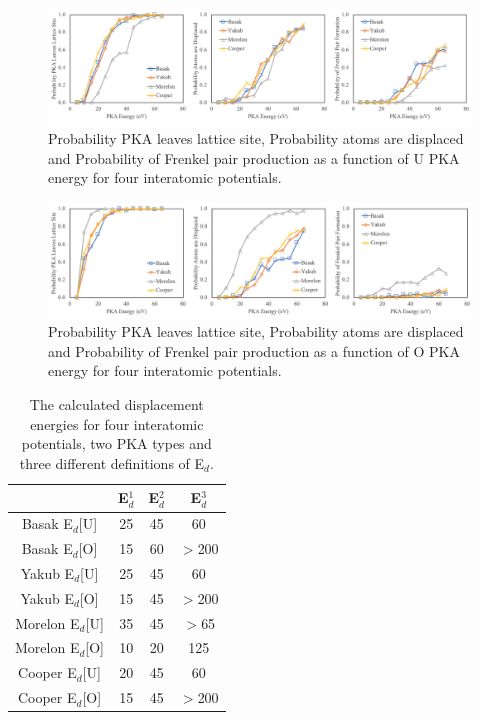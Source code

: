 \documentclass[review]{elsarticle}
\begin{document}
\begin{figure}[h]
 \centering
 \includegraphics[width=1.0\textwidth]{pot_compU.png}
 \caption{Probability PKA leaves lattice site, Probability atoms are displaced and Probability of Frenkel pair production as a function of U PKA energy for four interatomic potentials. }
 \label{fig:pot_compU}
\end{figure}

\begin{figure}[h]
 \centering
 \includegraphics[width=1.0\textwidth]{pot_compO.png}
 \caption{ Probability PKA leaves lattice site, Probability atoms are displaced and Probability of Frenkel pair production as a function of O PKA energy for four interatomic potentials. }
 \label{fig:pot_compO}
\end{figure}

\begin{table}[h]\label{tab:Ed}
	\center
	\caption{The calculated displacement energies for four interatomic potentials, two PKA types and three different definitions of E$_d$.}
	\begin{tabular}{|c|c|c|c|}
		\hline
	 & E$_d^1$ & E$_d^2$ & E$_d^3$ \\
	 \hline
	Basak E$_d$[U]	& 25 & 45 & 60 \\
	Basak E$_d$[O]	& 15 & 60 & $>$200 \\
	 \hline
 	Yakub E$_d$[U]	& 25 & 45 & 60 \\
	Yakub E$_d$[O]	& 15 & 45 & $>$200 \\
	 \hline
	Morelon E$_d$[U]	& 35 & 45 & $>$65 \\
	Morelon E$_d$[O]	& 10 & 20 & 125 \\
	 \hline
	Cooper E$_d$[U]	& 20 & 45 & 60 \\
	Cooper E$_d$[O]	& 15 & 45 & $>$200 \\
	 \hline
	\end{tabular}
\end{table}
\end{document}
